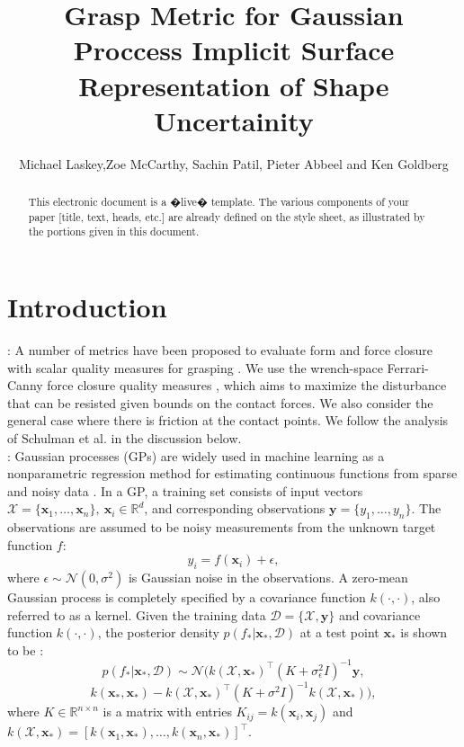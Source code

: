 \documentclass[letterpaper, 10 pt, conference]{ieeeconf}  %
\title{\LARGE \bf
Grasp Metric for Gaussian Proccess Implicit Surface Representation of Shape Uncertainity }
\author{Michael Laskey,Zoe McCarthy, Sachin Patil, Pieter Abbeel and Ken Goldberg}%
\newcommand{\by}{\mathbf{y}}
\newcommand{\bx}{\mathbf{x}}
\newcommand{\mX}{\mathcal{X}}
\newcommand{\mD}{\mathcal{D}}
\newcommand{\mN}{\mathcal{N}}
\begin{document}
\maketitle
\thispagestyle{empty}
\pagestyle{empty}


\begin{abstract}

This electronic document is a �live� template. The various components of your paper [title, text, heads, etc.] are already defined on the style sheet, as illustrated by the portions given in this document.

\end{abstract}


\section{Introduction}

\vspace{10pt}
: A number of metrics have been proposed to evaluate form and force closure with scalar quality measures for grasping \cite{bicchi2000}. We use the wrench-space Ferrari-Canny force closure quality measures \cite{ferrari1992}, which aims to maximize the disturbance that can be resisted given bounds on the contact forces. We also consider the general case where there is friction at the contact points. We follow the analysis of Schulman et al. \cite{schulman2011} in the discussion below.\\


: Gaussian processes (GPs) are widely used in machine learning as a nonparametric regression method for estimating continuous functions from sparse and noisy data \cite{rasmussen2006}. In a GP, a training set consists of input vectors $\mX = \{\bx_1, \ldots, \bx_n\}, ~\bx_i \in \mathbb{R}^d$, and corresponding observations $\by = \{y_1, \ldots, y_n\}$. The observations are assumed to be noisy measurements from the unknown target function $f$:
\begin{equation}
y_i = f(\bx_i) + \epsilon,
\end{equation}
where $\epsilon \sim \mN(0,\sigma^2)$ is Gaussian noise in the observations. A zero-mean Gaussian process is completely specified by a covariance function $k(\cdot,\cdot)$, also referred to as a kernel. Given the training data $\mD = \{\mX, \by\}$ and covariance function $k(\cdot,\cdot)$, the posterior density $p(f_*|\bx_*,\mD)$ at a test point $\bx_{*}$ is shown to be \cite{rasmussen2006}:
\begin{equation}
  p(f_*|\bx_*,\mD) 
  \sim 
  \mN\big(k(\mX,\bx_*)^{\intercal}(K + \sigma_{\epsilon}^2I)^{-1}\by,
\end{equation}
\[
  k(\bx_*,\bx_*)-k(\mX,\bx_*)^{\intercal}(K+\sigma^2I)^{-1}k(\mX,\bx_*)\big), \label{eq:GPposterior}
\]
where $K \in \mathbb{R}^{n \times n}$ is a matrix with entries $K_{ij} = k(\bx_i,\bx_j)$ and $k(\mX,\bx_*) = [k(\bx_1,\bx_*),\ldots,k(\bx_n,\bx_*)]^{\intercal}$. 
\end{document}
